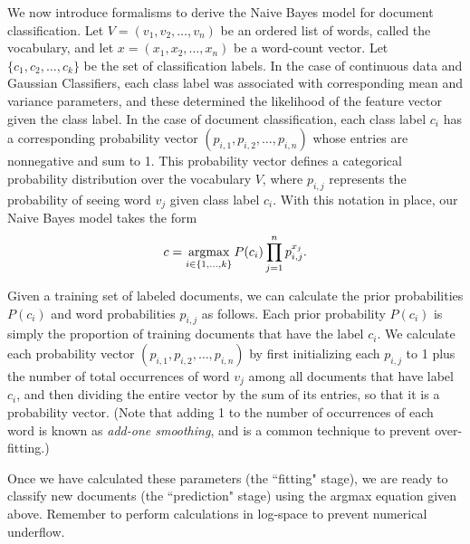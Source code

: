 We now introduce formalisms to derive the Naive Bayes model for document classification.
Let $V = (v_1,v_2,\ldots,v_n)$ be an ordered list of words, called the vocabulary, and let
$x = (x_1,x_2,\ldots,x_n)$ be a word-count vector. 
Let $\{c_1,c_2,\ldots,c_k\}$ be the set of classification labels.
In the case of continuous data and Gaussian Classifiers, each class label was associated with corresponding
mean and variance parameters, and these determined the likelihood of the feature vector given the class label.
In the case of document classification, each class label $c_i$ has a corresponding probability vector
$(p_{i,1}, p_{i,2}, \ldots, p_{i,n})$ whose entries are nonnegative and sum to 1. 
This probability vector defines a categorical probability distribution over the vocabulary $V$, where $p_{i,j}$
represents the probability of seeing word $v_j$ given class label $c_i$. 
With this notation in place, our Naive Bayes model takes the form
\[
c = \underset{i \in \{1, \ldots, k\}}{\mbox{argmax}}\, P(c_i)\prod_{j=1}^n p_{i,j}^{x_j}.
\]

Given a training set of labeled documents, we can calculate the prior probabilities $P(c_i)$ and word probabilities
$p_{i,j}$ as follows. 
Each prior probability $P(c_i)$ is simply the proportion of training documents that have the label $c_i$. 
We calculate each probability vector $(p_{i,1}, p_{i,2}, \ldots, p_{i,n})$ by first initializing 
each $p_{i,j}$ to 1 plus the number of total occurrences of word $v_j$ among all documents that have label $c_i$,
and then dividing the entire vector by the sum of its entries, so that it is a probability vector. 
(Note that adding 1 to the number of occurrences of each word is known as \emph{add-one smoothing}, and is a 
common technique to prevent over-fitting.)

Once we have calculated these parameters (the ``fitting" stage), we are ready to classify new documents 
(the ``prediction" stage) using the argmax equation given above. 
Remember to perform calculations in log-space to prevent numerical underflow.

